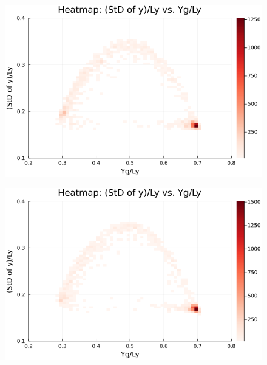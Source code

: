 \begin{figure}[H]
  \centering
  \includegraphics[scale=0.6]{image/RaRtmap10_heat/2023-12-28T12:38:52.536_map_10times_chi1.265_Ay50_rho0.4_T0.43_dT0.04_Rd0.0_Rt0.375_Ra1.4081535_g0.0003999718779659611_run4.0e8.png}
  \label{}
\end{figure}

\begin{figure}[H]
  \centering
  \includegraphics[scale=0.6]{image/RaRtmap10_heat/2023-12-28T12:38:52.620_map_10times_chi1.265_Ay50_rho0.4_T0.43_dT0.04_Rd0.0_Rt0.375_Ra1.877538_g0.0003999718779659611_run4.0e8.png}
  \label{}
\end{figure}

